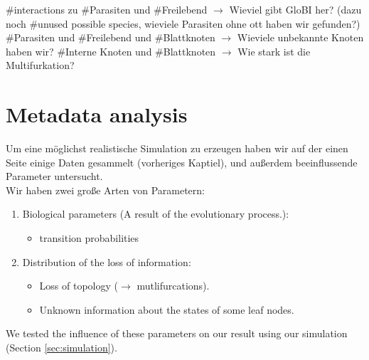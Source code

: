       \#interactions zu \#Parasiten und \#Freilebend $\rightarrow$ Wieviel gibt GloBI her? (dazu noch 
        \#unused possible species, wieviele Parasiten ohne ott haben wir gefunden?)
      \#Parasiten und \#Freilebend und \#Blattknoten $\rightarrow$ Wieviele unbekannte Knoten haben wir?
      \#Interne Knoten und \#Blattknoten $\rightarrow$ Wie stark ist die Multifurkation?

  \section{Metadata analysis}
    Um eine möglichst realistische Simulation zu erzeugen haben wir auf der einen Seite einige Daten 
      gesammelt (vorheriges Kaptiel), und außerdem beeinflussende Parameter untersucht. \\
    Wir haben zwei große Arten von Parametern:
    \begin{enumerate}
      \item Biological parameters (A result of the evolutionary process.):
        \begin{itemize}
          \item transition probabilities
        \end{itemize}
      \item Distribution of the loss of information:
        \begin{itemize}
          \item Loss of topology ($\rightarrow$ mutlifurcations).
          \item Unknown information about the states of some leaf nodes.
        \end{itemize}
    \end{enumerate}
    We tested the influence of these parameters on our result using our simulation (Section 
      \ref{sec:simulation}).
   
